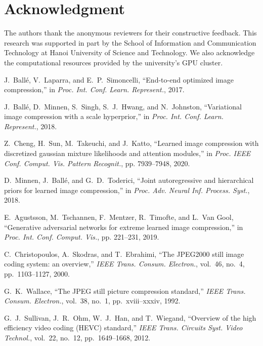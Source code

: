 \documentclass[conference]{IEEEtran}
\begin{document}
\section*{Acknowledgment}

The authors thank the anonymous reviewers for their constructive feedback. This research was supported in part by the School of Information and Communication Technology at Hanoi University of Science and Technology. We also acknowledge the computational resources provided by the university's GPU cluster.

\begin{thebibliography}{00}

J.~Ballé, V.~Laparra, and E.~P.~Simoncelli, ``End-to-end optimized image compression,'' in \textit{Proc. Int. Conf. Learn. Represent.}, 2017.

J.~Ballé, D.~Minnen, S.~Singh, S.~J.~Hwang, and N.~Johnston, ``Variational image compression with a scale hyperprior,'' in \textit{Proc. Int. Conf. Learn. Represent.}, 2018.

Z.~Cheng, H.~Sun, M.~Takeuchi, and J.~Katto, ``Learned image compression with discretized gaussian mixture likelihoods and attention modules,'' in \textit{Proc. IEEE Conf. Comput. Vis. Pattern Recognit.}, pp. 7939--7948, 2020.

D.~Minnen, J.~Ballé, and G.~D.~Toderici, ``Joint autoregressive and hierarchical priors for learned image compression,'' in \textit{Proc. Adv. Neural Inf. Process. Syst.}, 2018.

E.~Agustsson, M.~Tschannen, F.~Mentzer, R.~Timofte, and L.~Van Gool, ``Generative adversarial networks for extreme learned image compression,'' in \textit{Proc. Int. Conf. Comput. Vis.}, pp. 221--231, 2019.

C.~Christopoulos, A.~Skodras, and T.~Ebrahimi, ``The JPEG2000 still image coding system: an overview,'' \textit{IEEE Trans. Consum. Electron.}, vol.~46, no.~4, pp.~1103--1127, 2000.

G.~K.~Wallace, ``The JPEG still picture compression standard,'' \textit{IEEE Trans. Consum. Electron.}, vol.~38, no.~1, pp.~xviii--xxxiv, 1992.

G.~J.~Sullivan, J.~R.~Ohm, W.~J.~Han, and T.~Wiegand, ``Overview of the high efficiency video coding (HEVC) standard,'' \textit{IEEE Trans. Circuits Syst. Video Technol.}, vol.~22, no.~12, pp.~1649--1668, 2012.


\end{thebibliography}
\end{document}
